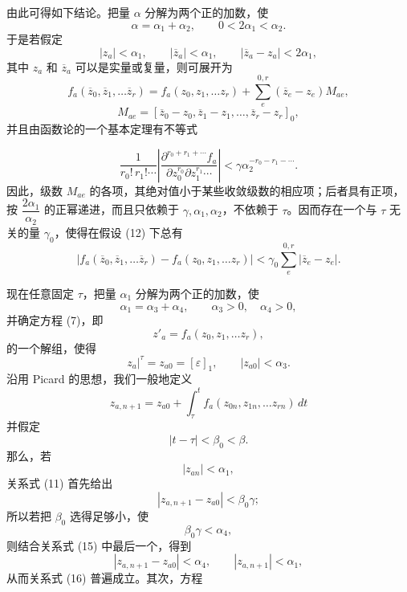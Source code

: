 \documentclass[11pt,a4paper,leqno]{article}
\begin{document}
由此可得如下结论。把量 $\alpha$ 分解为两个正的加数，使
\[
\alpha=\alpha_1+\alpha_2,\qquad 0<2\alpha_1<\alpha_2.
\]
于是若假定
\begin{equation}\tag{12}
|z_a|<\alpha_1,\qquad |\overline z_a|<\alpha_1,\qquad
|\overline z_a-z_a|<2\alpha_1,
\end{equation}
其中 $z_a$ 和 $\overline z_a$ 可以是实量或复量，则可展开为
\[
f_a(\overline z_0,\overline z_1,\ldots\overline z_r)
=f_a(z_0,z_1,\ldots z_r)
+\sum_e^{0,r}(\overline z_e-z_e)M_{ae},
\]
\[
M_{ae}=[\overline z_0-z_0,\overline z_1-z_1,\ldots,
\overline z_r-z_r]_0,
\]
并且由函数论的一个基本定理有不等式

\[
\frac{1}{r_0!\,r_1!\cdots}
\left|\frac{\partial^{r_0+r_1+\cdots}f_a}
{\partial z_0^{r_0}\partial z_1^{r_1}\cdots}\right|
<\gamma\alpha_2^{-r_0-r_1-\cdots}.
\]
因此，级数 $M_{ae}$ 的各项，其绝对值小于某些收敛级数的相应项；后者具有正项，按 $\dfrac{2\alpha_1}{\alpha_2}$ 的正幂递进，而且只依赖于 $\gamma,\alpha_1,\alpha_2$，不依赖于 $\tau$。因而存在一个与 $\tau$ 无关的量 $\gamma_0$，使得在假设 (12) 下总有
\begin{equation}\tag{13}
|f_a(\overline z_0,\overline z_1,\ldots\overline z_r)
-f_a(z_0,z_1,\ldots z_r)|
<\gamma_0\sum_e^{0,r}|\overline z_e-z_e|.
\end{equation}

现在任意固定 $\tau$，把量 $\alpha_1$ 分解为两个正的加数，使
\[
\alpha_1=\alpha_3+\alpha_4,\qquad \alpha_3>0,\quad\alpha_4>0,
\]
并确定方程 (7)，即
\begin{equation}\tag{14}
z'_a=f_a(z_0,z_1,\ldots z_r),
\end{equation}
的一个解组，使得
\begin{equation}\tag{15}
\left.z_a\right|^\tau=z_{a0}=[\varepsilon]_1,\qquad
|z_{a0}|<\alpha_3.
\end{equation}
沿用 Picard 的思想，我们一般地定义
\[
z_{a,n+1}=z_{a0}+\int_\tau^t
f_a(z_{0n},z_{1n},\ldots z_{rn})\,dt
\]
并假定
\[
|t-\tau|<\beta_0<\beta.
\]
那么，若
\begin{equation}\tag{16}
|z_{an}|<\alpha_1,
\end{equation}
关系式 (11) 首先给出
\[
|z_{a,n+1}-z_{a0}|<\beta_0\gamma;
\]
所以若把 $\beta_0$ 选得足够小，使
\begin{equation}\tag{17}
\beta_0\gamma<\alpha_4,
\end{equation}
则结合关系式 (15) 中最后一个，得到
\[
|z_{a,n+1}-z_{a0}|<\alpha_4,\qquad |z_{a,n+1}|<\alpha_1,
\]
从而关系式 (16) 普遍成立。其次，方程
\end{document}
